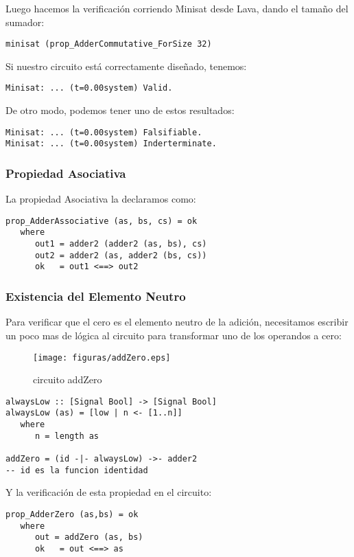 \noindent Luego hacemos la verificación corriendo Minisat
 desde Lava, dando el tamaño del sumador:
\begin{lstlisting}
minisat (prop_AdderCommutative_ForSize 32)
\end{lstlisting}

\noindent Si nuestro circuito está correctamente diseñado, tenemos:
{\footnotesize
\begin{verbatim}
Minisat: ... (t=0.00system) Valid.
\end{verbatim}
}

\noindent De otro modo, podemos tener uno de estos resultados:

{\footnotesize
\begin{verbatim}
Minisat: ... (t=0.00system) Falsifiable.
Minisat: ... (t=0.00system) Inderterminate.
\end{verbatim}
}

\subsubsection{Propiedad Asociativa}
\noindent La propiedad Asociativa la declaramos como:
{\footnotesize
\begin{verbatim}
prop_AdderAssociative (as, bs, cs) = ok
   where
      out1 = adder2 (adder2 (as, bs), cs)
      out2 = adder2 (as, adder2 (bs, cs))
      ok   = out1 <==> out2
\end{verbatim}
}

\subsubsection{Existencia del Elemento Neutro}
\noindent Para verificar que el cero es el elemento neutro de la adición, necesitamos escribir un poco mas de lógica al circuito para transformar uno de los operandos a cero:

\begin{figure}[h]
  \centering
\texttt{[image: figuras/addZero.eps]}
  \caption{circuito addZero}
\end{figure}


\begin{lstlisting}
alwaysLow :: [Signal Bool] -> [Signal Bool]
alwaysLow (as) = [low | n <- [1..n]]
   where
      n = length as

addZero = (id -|- alwaysLow) ->- adder2
-- id es la funcion identidad
\end{lstlisting}
\noindent Y la verificación de esta propiedad en el circuito:
{\footnotesize
\begin{verbatim}
prop_AdderZero (as,bs) = ok
   where
      out = addZero (as, bs)
      ok   = out <==> as
\end{verbatim}
}


